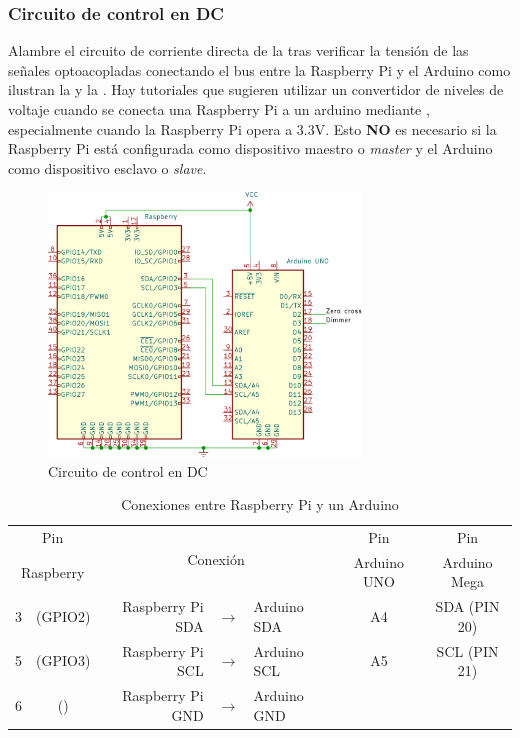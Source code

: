 \subsubsection{Circuito de control en DC}%
Alambre el circuito de corriente directa de la  tras verificar la tensión de las señales optoacopladas conectando el bus \IIC entre la Raspberry Pi y el Arduino como ilustran la  y la .
Hay tutoriales que sugieren utilizar un convertidor de niveles de voltaje cuando se conecta una Raspberry Pi a un arduino mediante \IIC, especialmente cuando la Raspberry Pi opera a 3.3V.
Esto \textbf{NO} es necesario si la Raspberry Pi está configurada como dispositivo maestro o \emph{master} y el Arduino como dispositivo esclavo o \emph{slave}.

\begin{figure}[H]
	\centering
	\includegraphics[width=0.5\columnwidth,height=7cm,keepaspectratio]{img/circuit-dc.png}
	\caption{Circuito de control en DC}%
	\label{fig:circuit-dc}
\end{figure}


\begin{table}
	\centering
	\caption{Conexiones \IIC entre Raspberry Pi y un Arduino}
	\label{tbl:pi-arduino-i2c} %
	\begin{tabularx}{0.8\linewidth}{cc rcl c c}
	\toprule
	\multicolumn{2}{c}{   Pin   } & \multicolumn{3}{c}{\multirow{2}{*}{Conexión}}  &     Pin     &     Pin     \\
	\multicolumn{2}{c}{Raspberry} & \multicolumn{3}{c}{}                           & Arduino UNO & Arduino Mega \\
	\midrule
	       3 & (GPIO2)            & Raspberry Pi SDA & \(\rightarrow{}\) & Arduino SDA & A4          & SDA (PIN 20) \\
	       5 & (GPIO3)            & Raspberry Pi SCL & \(\rightarrow{}\) & Arduino SCL & A5          & SCL (PIN 21) \\
	       6 & (\GND)             & Raspberry Pi GND & \(\rightarrow{}\) & Arduino GND & \GND        & \GND         \\
	\bottomrule
	\end{tabularx}
\end{table}

